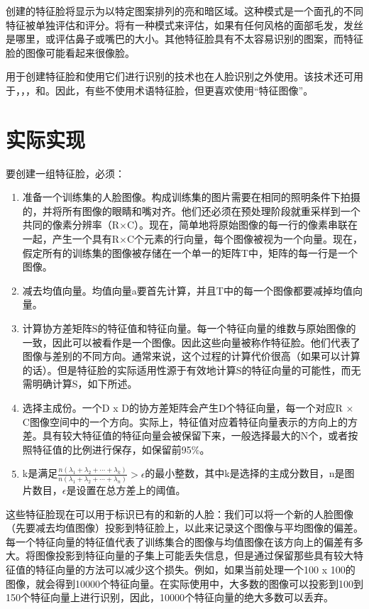 \documentclass[UTF8]{ctexart}
\begin{document}
创建的特征脸将显示为以特定图案排列的亮和暗区域。这种模式是一个面孔的不同特征被单独评估和评分。将有一种模式来评估{\color{blue}{对称性}}，如果有任何风格的面部毛发，发丝是哪里，或评估鼻子或嘴巴的大小。其他特征脸具有不太容易识别的图案，而特征脸的图像可能看起来很像脸。

用于创建特征脸和使用它们进行识别的技术也在人脸识别之外使用。该技术还可用于{\color{blue}{手写分析}}，{\color{blue}{唇读}}，{\color{blue}{语音识别}}，{\color{blue}{手语/手势解释}}和{\color{blue}{医学影像分析}}。因此，有些不使用术语特征脸，但更喜欢使用“特征图像”。

\section{实际实现}
要创建一组特征脸，必须：
\begin{enumerate}
	\item 准备一个训练集的人脸图像。构成训练集的图片需要在相同的照明条件下拍摄的，并将所有图像的眼睛和嘴对齐。他们还必须在预处理阶段就重采样到一个共同的像素分辨率（R×C）。现在，简单地将原始图像的每一行的像素串联在一起，产生一个具有R×C个元素的行向量，每个图像被视为一个向量。现在，假定所有的训练集的图像被存储在一个单一的矩阵T中，矩阵的每一行是一个图像。
	\item 减去均值向量。均值向量a要首先计算，并且T中的每一个图像都要减掉均值向量。
	\item 计算协方差矩阵S的特征值和特征向量。每一个特征向量的维数与原始图像的一致，因此可以被看作是一个图像。因此这些向量被称作特征脸。他们代表了图像与{\color{blue}{均值图像（mean image）}}差别的不同方向。通常来说，这个过程的计算代价很高（如果可以计算的话）。但是特征脸的实际适用性源于有效地计算S的特征向量的可能性，而无需明确计算S，如下所述。
	\item 选择主成份。一个D x D的协方差矩阵会产生D个特征向量，每一个对应R × C图像空间中的一个方向。实际上，特征值对应着特征向量表示的方向上的方差。具有较大特征值的特征向量会被保留下来，一般选择最大的N个，或者按照特征值的比例进行保存，如保留前95\%。
	\item k是满足$\frac{n(\lambda_1 + \lambda_2 + \cdots + \lambda_k)}{n(\lambda_1 + \lambda_2 + \cdots + \lambda_n)}>\epsilon$的最小整数，其中k是选择的主成分数目，n是图片数目，$\epsilon$是设置在总方差上的阈值。
\end{enumerate}

这些特征脸现在可以用于标识已有的和新的人脸：我们可以将一个新的人脸图像（先要减去均值图像）投影到特征脸上，以此来记录这个图像与平均图像的偏差。每一个特征向量的特征值代表了训练集合的图像与均值图像在该方向上的偏差有多大。将图像投影到特征向量的子集上可能丢失信息，但是通过保留那些具有较大特征值的特征向量的方法可以减少这个损失。例如，如果当前处理一个100 x 100的图像，就会得到10000个特征向量。在实际使用中，大多数的图像可以投影到100到150个特征向量上进行识别，因此，10000个特征向量的绝大多数可以丢弃。
\end{document}
